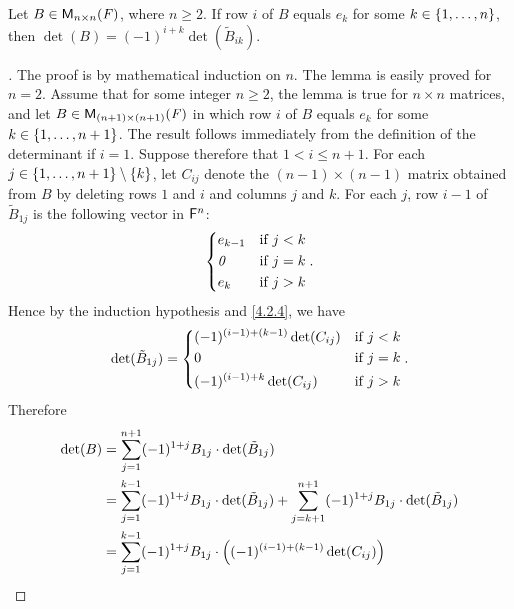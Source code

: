 \begin{lem}\label{4.2.5}
	Let \(B \in \ms[n][n][\F]\), where \(n \geq 2\).
	If row \(i\) of \(B\) equals \(e_k\) for some \(k \in \left\lbrace1, \dots, n\right\rbrace\), then \(\det(B) = (-1)^{i + k} \det(\tilde{B}_{i k})\).
\end{lem}

\begin{proof}[]
	The proof is by mathematical induction on \(n\).
	The lemma is easily proved for \(n = 2\).
	Assume that for some integer \(n \geq 2\), the lemma is true for \(n \times n\) matrices, and let \(B \in \ms[(n + 1)][(n + 1)][\F]\) in which row \(i\) of \(B\) equals \(e_k\) for some \(k \in \left\lbrace1, \dots, n + 1\right\rbrace\).
	The result follows immediately from the definition of the determinant if \(i = 1\).
	Suppose therefore that \(1 < i \leq n + 1\).
	For each \(j \in \left\lbrace1, \dots, n + 1\right\rbrace \setminus \left\lbrace k\right\rbrace\), let \(C_{i j}\) denote the \((n - 1) \times (n - 1)\) matrix obtained from \(B\) by deleting rows \(1\) and \(i\) and columns \(j\) and \(k\).
	For each \(j\), row \(i - 1\) of \(\tilde{B}_{1 j}\) is the following vector in \(\mathsf{F}^n\):
	\[
		\begin{dcases}
			e_{k - 1} & \text{if } j < k \\
			\mathit{0}       & \text{if } j = k \\
			e_k       & \text{if } j > k
		\end{dcases}.
	\]
	Hence by the induction hypothesis and \cref{4.2.4}, we have
	\[
		\det(\tilde{B}_{1 j}) = \begin{dcases}
			(-1)^{(i - 1) + (k - 1)} \det(C_{i j}) & \text{if } j < k \\
			0                                      & \text{if } j = k \\
			(-1)^{(i - 1) + k} \det(C_{i j})       & \text{if } j > k
		\end{dcases}.
	\]
	Therefore
	\begin{align*}
		\det(B) & = \sum_{j = 1}^{n + 1} (-1)^{1 + j} B_{1 j} \cdot \det(\tilde{B}_{1 j})                                                                                      \\
		        & = \sum_{j = 1}^{k - 1} (-1)^{1 + j} B_{1 j} \cdot \det(\tilde{B}_{1 j}) + \sum_{j = k + 1}^{n + 1} (-1)^{1 + j} B_{1 j} \cdot \det(\tilde{B}_{1 j})          \\
		        & = \sum_{j = 1}^{k - 1} (-1)^{1 + j} B_{1 j} \cdot \pa{(-1)^{(i - 1) + (k - 1)} \det(C_{i j})}                                                                \\

\end{align*}
\end{proof}
